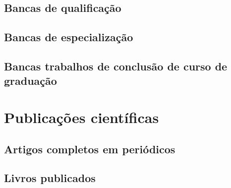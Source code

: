 \subsection{Bancas de qualificação}



\subsection{Bancas de especialização}



\subsection{Bancas trabalhos de conclusão de curso de graduação}






\section{Publicações científicas}


\subsection{Artigos completos em periódicos}




\subsection{Livros publicados}

